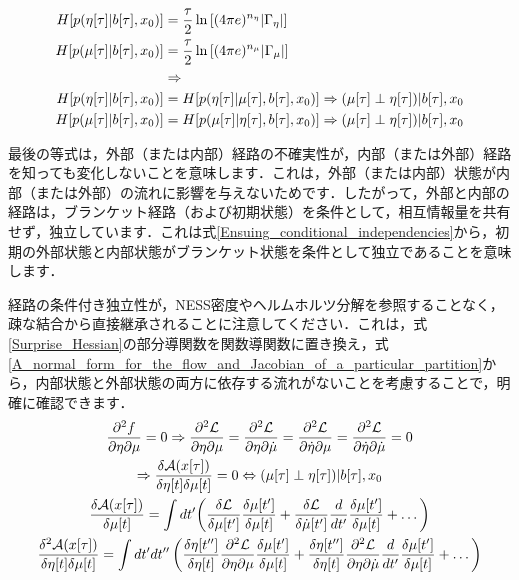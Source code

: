 \documentclass[a4paper, titlepage]{jsarticle}
\begin{document}
\begin{equation}
    \begin{aligned}
        H[p(\eta[\tau] | b[\tau], x_0)] &= \frac{\tau}{2} \ln \qty[(4\pi e)^{n_\eta} |\Gamma_{\eta}|] \\
        H[p(\mu[\tau] | b[\tau], x_0)] &= \frac{\tau}{2} \ln \qty[(4\pi e)^{n_\mu} |\Gamma_{\mu}|] \\
        &\Rightarrow \\
        H[p(\eta[\tau] | b[\tau], x_0)] &= H[p(\eta[\tau] | \mu[\tau], b[\tau], x_0)] \Rightarrow (\mu[\tau] \perp \eta[\tau]) | b[\tau], x_0 \\
        H[p(\mu[\tau] | b[\tau], x_0)] &= H[p(\mu[\tau] | \eta[\tau], b[\tau], x_0)] \Rightarrow (\mu[\tau] \perp \eta[\tau]) | b[\tau], x_0
    \end{aligned}
\end{equation}
\par
最後の等式は，外部（または内部）経路の不確実性が，内部（または外部）経路を知っても変化しないことを意味します．これは，外部（または内部）状態が内部（または外部）の流れに影響を与えないためです．したがって，外部と内部の経路は，ブランケット経路（および初期状態）を条件として，相互情報量を共有せず，独立しています．これは式\eqref{Ensuing_conditional_independencies}から，初期の外部状態と内部状態がブランケット状態を条件として独立であることを意味します．
\par
経路の条件付き独立性が，NESS密度やヘルムホルツ分解を参照することなく，疎な結合から直接継承されることに注意してください．これは，式\eqref{Surprise_Hessian}の部分導関数を関数導関数に置き換え，式\eqref{A_normal_form_for_the_flow_and_Jacobian_of_a_particular_partition}から，内部状態と外部状態の両方に依存する流れがないことを考慮することで，明確に確認できます．
\begin{equation}
    \begin{gathered}
        \frac{\partial^2 f}{\partial\eta\partial\mu} = 0 \Rightarrow \frac{\partial^2 \mathcal{L}}{\partial\eta\partial\mu} = \frac{\partial^2 \mathcal{L}}{\partial\eta\partial\dot{\mu}}=\frac{\partial^2\mathcal{L}}{\partial\dot{\eta}\partial\mu}=\frac{\partial^2\mathcal{L}}{\partial\dot{\eta}\partial\dot{\mu}} = 0 \\
        \Rightarrow\frac{\delta\mathcal{A}(x[\tau])}{\delta\eta\qty[t]\delta\mu[t]} = 0 \Leftrightarrow (\mu[\tau] \perp \eta[\tau]) | b[\tau], x_0 \\
        \frac{\delta\mathcal{A}(x[\tau])}{\delta\mu[t]} = \int dt'\qty(\frac{\delta\mathcal{L}}{\delta\mu[t']} \frac{\delta\mu\qty[t']}{\delta\mu[t]}+\frac{\delta\mathcal{L}}{\delta\dot{\mu}[t']}\frac{d}{dt'}\frac{\delta\mu\qty[t']}{\delta\mu[t]} + \dots) \\
        \frac{\delta^2\mathcal{A}(x[\tau])}{\delta\eta[t]\delta\mu[t]} = \int dt'dt'' \left( \frac{\delta \eta[t'']}{\delta\eta[t]} \frac{\partial^2 \mathcal{L}}{\partial\eta\partial\mu} \frac{\delta\mu[t']}{\delta\mu[t]} + \frac{\delta \eta[t'']}{\delta\eta[t]}\frac{\partial^2 \mathcal{L}}{\partial\eta\partial\dot{\mu}}\frac{d}{dt'}\frac{\delta\mu[t']}{\delta\mu[t]}+\dots\right)
    \end{gathered}
\end{equation}
\end{document}
